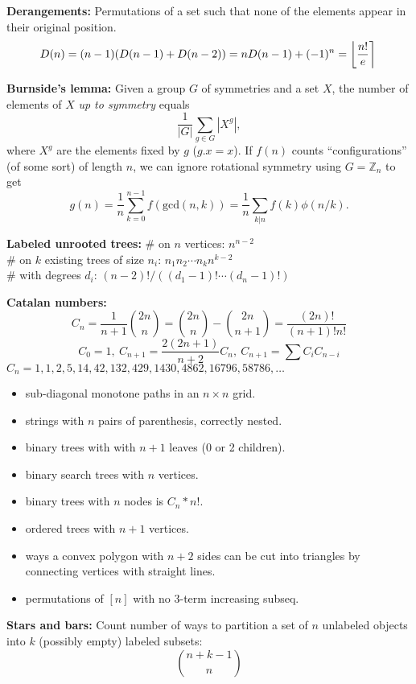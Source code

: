 \noindent
\textbf{Derangements:}
\noindent
Permutations of a set such that none of the elements appear in their original position.
\[ \mkern-2mu D(n) = (n-1)(D(n-1)+D(n-2)) = n D(n-1)+(-1)^n = \left\lfloor\frac{n!}{e}\right\rceil \]

\noindent
\textbf{Burnside's lemma:}
\noindent
Given a group $G$ of symmetries and a set $X$, the number of elements of $X$ \emph{up to symmetry} equals
 \[ {\frac {1}{|G|}}\sum _{{g\in G}}|X^{g}|, \]
 where $X^{g}$ are the elements fixed by $g$ ($g.x = x$).
\noindent
 If $f(n)$ counts ``configurations'' (of some sort) of length $n$, we can ignore rotational symmetry using $G = \mathbb Z_n$ to get
 \[ g(n) = \frac 1 n \sum_{k=0}^{n-1}{f(\text{gcd}(n, k))} = \frac 1 n \sum_{k|n}{f(k)\phi(n/k)}. \]

\noindent
\textbf{Labeled unrooted trees:}
\noindent
\# on $n$ vertices: $n^{n-2}$ \\
\# on $k$ existing trees of size $n_i$: $n_1n_2\cdots n_k n^{k-2}$ \\
\# with degrees $d_i$: $(n-2)! / ((d_1-1)! \cdots (d_n-1)!)$

\noindent
\textbf{Catalan numbers:}
\noindent
\[ C_n=\frac{1}{n+1}\binom{2n}{n}= \binom{2n}{n}-\binom{2n}{n+1} = \frac{(2n)!}{(n+1)!n!} \]
\[ C_0=1,\ C_{n+1} = \frac{2(2n+1)}{n+2}C_n,\ C_{n+1}=\sum C_iC_{n-i} \]
${C_n = 1, 1, 2, 5, 14, 42, 132, 429, 1430, 4862, 16796, 58786, \dots}$
\begin{itemize}
	\item sub-diagonal monotone paths in an $n\times n$ grid.
	\item strings with $n$ pairs of parenthesis, correctly nested.
	\item binary trees with with $n+1$ leaves (0 or 2 children).
	\item binary search trees with $n$ vertices.
	\item binary trees with $n$ nodes is $C_n * n!$.
	\item ordered trees with $n+1$ vertices.
	\item ways a convex polygon with $n+2$ sides can be cut into triangles by connecting vertices with straight lines.
	\item permutations of $[n]$ with no 3-term increasing subseq.
\end{itemize}

\noindent
\textbf{Stars and bars:}
\noindent
Count number of ways to partition a set of $n$ unlabeled objects into $k$ (possibly empty) labeled subsets:
\[ \binom{n+k-1}{n} \]

